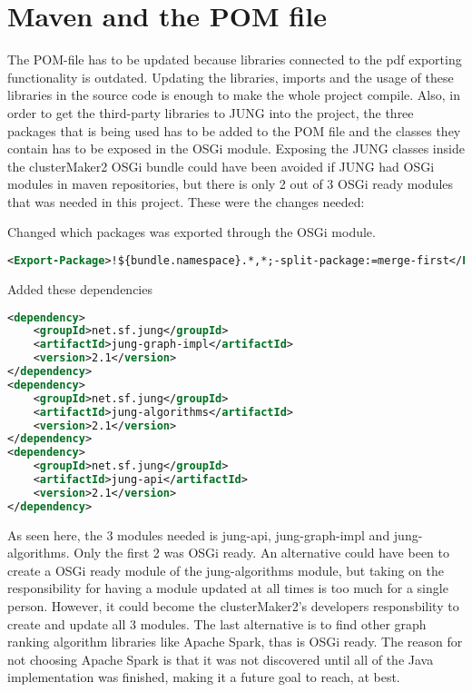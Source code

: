 \section{Maven and the POM file}
The POM-file has to be updated because libraries connected to the pdf exporting
functionality is outdated. Updating the libraries, imports and the usage of
these libraries in the source code is enough to make the whole project compile.
Also, in order to get the third-party libraries to JUNG\cite{jung} into the
project, the three packages that is being used has to be added to the POM file
and the classes they contain has to be exposed in the OSGi
module\cite{osgi-felix}. Exposing the JUNG classes inside the clusterMaker2 OSGi
bundle could have been avoided if JUNG had OSGi modules in maven repositories,
but there is only 2 out of 3 OSGi ready modules that was needed in this project.
These were the changes needed:

Changed which packages was exported through the OSGi module.

\begin{lstlisting}[language=XML, caption={POM-file OSGi changes}]
<Export-Package>!${bundle.namespace}.*,*;-split-package:=merge-first</Export-Package>
\end{lstlisting}

Added these dependencies

\begin{lstlisting}[language=XML, caption={POM-file JUNG changes}]
<dependency>
    <groupId>net.sf.jung</groupId>
    <artifactId>jung-graph-impl</artifactId>
    <version>2.1</version>
</dependency>
<dependency>
    <groupId>net.sf.jung</groupId>
    <artifactId>jung-algorithms</artifactId>
    <version>2.1</version>
</dependency>
<dependency>
    <groupId>net.sf.jung</groupId>
    <artifactId>jung-api</artifactId>
    <version>2.1</version>
</dependency>
\end{lstlisting}

As seen here, the 3 modules needed is jung-api, jung-graph-impl and
jung-algorithms. Only the first 2 was OSGi ready. An alternative could have been
to create a OSGi ready module of the jung-algorithms module, but taking on the
responsibility for having a module updated at all times is too much for a single
person. However, it could become the clusterMaker2's developers responsbility to
create and update all 3 modules. The last alternative is to find other graph
ranking algorithm libraries like Apache Spark\cite{spark}, thas is OSGi ready.
The reason for not choosing Apache Spark is that it was not discovered until all
of the Java implementation was finished, making it a future goal to reach, at
best.

